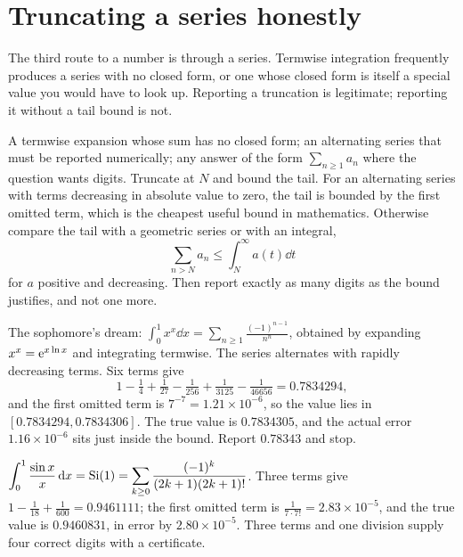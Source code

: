 \section{Truncating a series honestly}

The third route to a number is through a series. Termwise integration frequently produces a series with no closed form, or one whose closed form is itself a special value you would have to look up. Reporting a truncation is legitimate; reporting it without a tail bound is not.

\cue A termwise expansion whose sum has no closed form; an alternating series that must be reported numerically; any answer of the form $\sum_{n\geq1}a_{n}$ where the question wants digits.
\method Truncate at $N$ and bound the tail. For an alternating series with terms decreasing in absolute value to zero, the tail is bounded by the first omitted term, which is the cheapest useful bound in mathematics. Otherwise compare the tail with a geometric series or with an integral,
\[\sum_{n>N}a_{n}\leq\int_{N}^{\infty}a(t)\dd t\]
for $a$ positive and decreasing. Then report exactly as many digits as the bound justifies, and not one more.

\begin{worked}
The sophomore's dream: $\displaystyle\int_0^{1}x^{x}\dd x=\sum_{n\geq1}\frac{(-1)^{n-1}}{n^{n}}$, obtained by expanding $x^{x}=\mathrm{e}^{x\ln x}$ and integrating termwise. The series alternates with rapidly decreasing terms. Six terms give
\[1-\tfrac14+\tfrac{1}{27}-\tfrac{1}{256}+\tfrac{1}{3125}-\tfrac{1}{46656}=0.7834294,\]
and the first omitted term is $7^{-7}=1.21\times10^{-6}$, so the value lies in $[0.7834294,0.7834306]$. The true value is $0.7834305$, and the actual error $1.16\times10^{-6}$ sits just inside the bound. Report $0.78343$ and stop.
\end{worked}

\begin{worked}
$\displaystyle\int_0^{1}\frac{\sin x}{x}\,\mathrm{d} x=\operatorname{Si}(1)=\sum_{k\geq0}\frac{(-1)^{k}}{(2k+1)(2k+1)!}$. Three terms give $1-\tfrac{1}{18}+\tfrac{1}{600}=0.9461111$; the first omitted term is $\tfrac{1}{7\cdot7!}=2.83\times10^{-5}$, and the true value is $0.9460831$, in error by $2.80\times10^{-5}$. Three terms and one division supply four correct digits with a certificate.
\end{worked}

